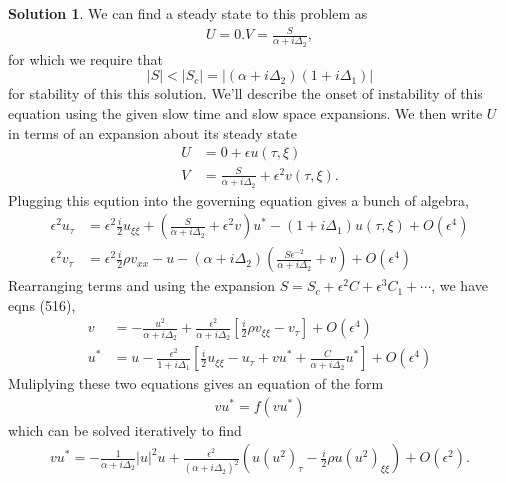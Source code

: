 \documentclass[12pt]{article}
\newcommand{\abs}[1]{ \left| #1 \right| }
\theoremstyle{definition}
\newtheorem{sol}{Solution}
\theoremstyle{remark}
\begin{document}
\begin{sol}
    We can find a steady state to this problem as 
    \begin{align*}
    U = 0. V = \frac{S}{\alpha + i \Delta_{2}},
    \end{align*}
    for which we require that 
\begin{equation*}
    \abs{S} < \abs{S_{c}} = \abs{(\alpha + i \Delta_{2})(1 + i \Delta_{1})}
\end{equation*}
    for stability of this this solution. We'll describe the onset of instability of this equation using the given slow time and slow space expansions. We then write $U$ in terms of an expansion about its steady state
     \begin{align*}
         U &= 0 + \epsilon u(\tau, \xi)\\
         V &= \frac{S}{\alpha + i \Delta_{2}} + \epsilon^{2} v(\tau, \xi).
    \end{align*}
    Plugging this eqution into the governing equation gives a bunch of algebra,
    \begin{align*}
        \epsilon^{2} u_{\tau} &= \epsilon^{2} \frac{i}{2} u_{\xi \xi} + \left(\frac{S}{\alpha + i \Delta_{2}} + \epsilon^{2} v \right)  u^{*}  - (1 + i \Delta_{1}) u(\tau, \xi) + O(\epsilon^{4})\\
        \epsilon^{2} v_{\tau} &= \epsilon^{2} \frac{i}{2} \rho v_{xx} - u - (\alpha + i \Delta_{2}) ( \frac{S \epsilon^{-2}}{\alpha + i \Delta_{2}}  + v ) + O(\epsilon^{4})
    \end{align*}
    Rearranging terms and using the expansion $S = S_{c} + \epsilon^{2} C + \epsilon^{3} C_{1} + \cdots$, we have eqns (516),
    \begin{align*}
        v &= - \frac{u^{2}}{\alpha + i \Delta_{2}} + \frac{\epsilon^{2}}{\alpha + i \Delta_{2}} \left[ \frac{i}{2} \rho v_{\xi \xi}  - v_{\tau} \right] + O(\epsilon^{4})\\
        u^{*} &= u - \frac{\epsilon^{2}}{1 + i \Delta_{1}} \left[ \frac{i}{2} u_{\xi\xi} - u_{\tau} + v u^{*} + \frac{C}{\alpha + i \Delta_{2}}  u^{*} \right] + O(\epsilon^{4})
    \end{align*}
    Muliplying these two equations gives an equation of the form
    \begin{align*}
        v u^{*} = f(vu^{*})
    \end{align*}
    which can be solved iteratively to find
    \begin{align*}
        v u^{*} = - \frac{1}{\alpha + i \Delta_{2}} \abs{u}^{2} u + \frac{\epsilon^{2}}{(\alpha + i \Delta_{2})^{2}} \left( u (u^{2})_{\tau} - \frac{i}{2} \rho u (u^{2})_{\xi\xi}  \right) + O(\epsilon^{2}).

\end{align*}
\end{sol}
\end{document}
